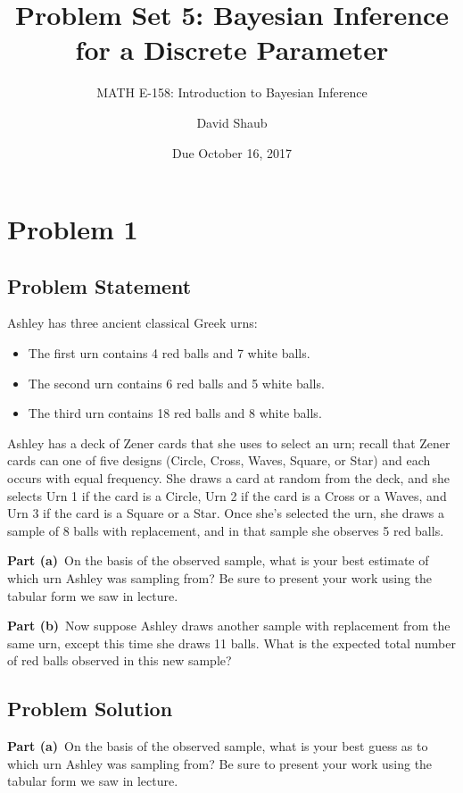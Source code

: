 \documentclass[12pt]{article}
\title{Problem Set 5: Bayesian Inference for a Discrete Parameter}
\author{MATH E-158: Introduction to Bayesian Inference}
\author{David Shaub}
\date{Due October 16, 2017}
\theoremstyle{definition}
\begin{document}
	
	\maketitle


\section*{Problem 1}


\subsection*{Problem Statement}

Ashley has three ancient classical Greek urns:
\begin{itemize}
	\item The first urn contains 4 red balls and 7 white balls.
	\item The second urn contains 6 red balls and 5 white balls.
	\item The third urn contains 18 red balls and 8 white balls.
\end{itemize}
Ashley has a deck of Zener cards that she uses to select an urn; recall that Zener cards can one of five designs (Circle, Cross, Waves, Square, or Star) and each occurs with equal frequency. She draws a card at random from the deck, and she selects Urn 1 if the card is a Circle, Urn 2 if the card is a Cross or a Waves, and Urn 3 if the card is a Square or a Star. Once she's selected the urn, she draws a sample of 8 balls with replacement, and in that sample she observes 5 red balls.

\bigskip
\noindent
{\bf Part (a)}\ On the basis of the observed sample, what is your best estimate of which urn Ashley was sampling from? Be sure to present your work using the tabular form we saw in lecture.

\bigskip
\noindent
{\bf Part (b)}\ Now suppose Ashley draws another sample with replacement from the same urn, except this time she draws 11 balls. What is the expected total number of red balls observed in this new sample?

\newpage
\subsection*{Problem Solution}

\noindent
{\bf Part (a)}\ On the basis of the observed sample, what is your best guess as to which urn Ashley was sampling from? Be sure to present your work using the tabular form we saw in lecture.\\
\end{document}

